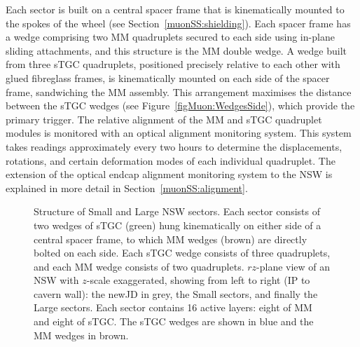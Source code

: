 \documentclass[cernpreprint, atlasdraft=false, UKenglish,british,orcidlogo, texmf, orcidlogo]{atlasdoc}
\begin{document}
Each sector is built on a central spacer frame that is kinematically mounted to the spokes of the wheel (see Section~\ref{muonSS:shielding}).
Each spacer frame has a wedge comprising two \gls{MM} quadruplets secured to each side using in-plane sliding attachments, and this structure is the \gls{MM} double wedge.
A wedge built from three \gls{sTGC} quadruplets, positioned precisely relative to each other with glued fibreglass frames, is kinematically mounted on each side of the spacer frame, sandwiching the \gls{MM} assembly.
This arrangement maximises the distance between the \gls{sTGC} wedges (see Figure~\ref{figMuon:WedgesSide}), which provide the primary trigger.
The relative alignment of the \gls{MM} and \gls{sTGC} quadruplet modules is monitored with an optical alignment monitoring system. This system takes readings approximately every two hours to determine the displacements, rotations, and certain deformation modes of each individual quadruplet. The extension of the optical endcap alignment monitoring system to the \gls{NSW} is explained in more detail in Section~\ref{muonSS:alignment}.
 
\begin{figure}[!h]
\caption{\protect{} Structure of Small and Large \gls{NSW} sectors. Each sector consists of two wedges of \gls{sTGC} (green) hung kinematically on either side of a central spacer frame, to which \gls{MM} wedges (brown) are directly bolted on each side. Each \gls{sTGC} wedge consists of three quadruplets, and each \gls{MM} wedge consists of two quadruplets. \protect{} $rz$-plane view of an \gls{NSW} with $z$-scale exaggerated, showing from left to right (\gls{IP} to cavern wall): the \gls{newJD} in grey, the Small sectors, and finally the Large sectors.  Each sector contains \num{16} active layers: eight of \gls{MM} and eight of \gls{sTGC}. The \gls{sTGC} wedges are shown in blue and the \gls{MM} wedges in brown.}
\label{figMuon:Wedges}
\end{figure}
 
\end{document}
